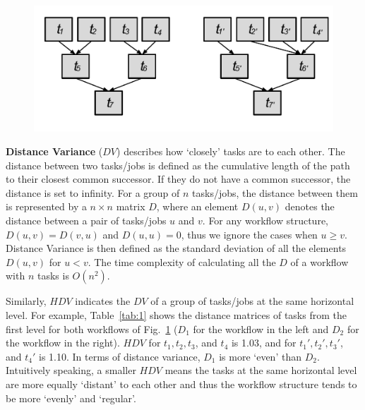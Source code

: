 \documentclass[final]{IEEEtran}
\begin{document}
\begin{figure}[htb]
	\centering
	\includegraphics[width=0.85\linewidth]{figure/hifv.pdf}
	\label{fig:hifv}
	\vspace{-10pt}
\end{figure}

\textbf{Distance Variance} ($DV$) describes how `closely' tasks are to each other. The distance between two tasks/jobs is defined as the cumulative length of the path to their closest common successor. If they do not have a common successor, the distance is set to infinity. For a group of $n$ tasks/jobs, the distance between them is represented by a $n \times n$ matrix $D$, where an element $D(u,v)$ denotes the distance between a pair of tasks/jobs $u$ and $v$. For any workflow structure, $D(u,v)=D(v,u)$ and $D(u,u)=0$, thus we ignore the cases when $u \geq v$. Distance Variance is then defined as the standard deviation of all the elements $D(u,v)$ for $u<v$. The time complexity of calculating all the $D$ of a workflow with $n$ tasks is $O(n^2)$. 

Similarly, $HDV$ indicates the $DV$ of a group of tasks/jobs at the same horizontal level. For example, Table~\ref{tab:1} shows the distance matrices of tasks from the first level for both workflows of Fig.~\ref{fig:hifv} ($D_1$ for the workflow in the left and $D_2$ for the workflow in the right). $HDV$ for $t_1, t_2, t_3$, and $t_4$ is 1.03, and for $t_1', t_2', t_3'$, and $t_4'$ is 1.10. In terms of distance variance, $D_1$ is more `even' than $D_2$. Intuitively speaking, a smaller $HDV$ means the tasks at the same horizontal level are more equally `distant' to each other and thus the workflow structure tends to be more `evenly' and `regular'. 
\end{document}
